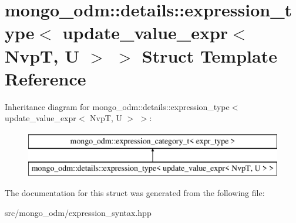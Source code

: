 \hypertarget{structmongo__odm_1_1details_1_1expression__type_3_01update__value__expr_3_01NvpT_00_01U_01_4_01_4}{}\section{mongo\+\_\+odm\+:\+:details\+:\+:expression\+\_\+type$<$ update\+\_\+value\+\_\+expr$<$ NvpT, U $>$ $>$ Struct Template Reference}
\label{structmongo__odm_1_1details_1_1expression__type_3_01update__value__expr_3_01NvpT_00_01U_01_4_01_4}
Inheritance diagram for mongo\+\_\+odm\+:\+:details\+:\+:expression\+\_\+type$<$ update\+\_\+value\+\_\+expr$<$ NvpT, U $>$ $>$\+:\begin{figure}[H]
\begin{center}
\leavevmode
\includegraphics[height=2.000000cm]{structmongo__odm_1_1details_1_1expression__type_3_01update__value__expr_3_01NvpT_00_01U_01_4_01_4}
\end{center}
\end{figure}


The documentation for this struct was generated from the following file\+:\begin{DoxyCompactItemize}
\item 
src/mongo\+\_\+odm/expression\+\_\+syntax.\+hpp\end{DoxyCompactItemize}
